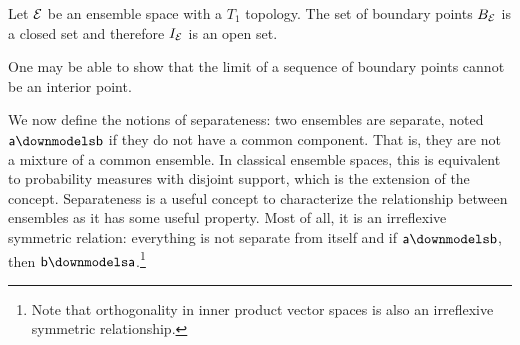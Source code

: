 \begin{conj}
	Let $\mathcal{E}$ be an ensemble space with a $T_1$ topology. The set of boundary points $B_{\mathcal{E}}$ is a closed set and therefore $I_{\mathcal{E}}$ is an open set.
\end{conj}
\begin{remark}
	One may be able to show that the limit of a sequence of boundary points cannot be an interior point.
\end{remark}

We now define the notions of separateness: two ensembles are separate, noted $\ens[a] \separate \ens[b]$ if they do not have a common component. That is, they are not a mixture of a common ensemble. In classical ensemble spaces, this is equivalent to probability measures with disjoint support, which is the extension of the concept. Separateness is a useful concept to characterize the relationship between ensembles as it has some useful property. Most of all, it is an irreflexive symmetric relation: everything is not separate from itself and if $\ens[a] \separate \ens[b]$, then $\ens[b] \separate \ens[a]$.\footnote{Note that orthogonality in inner product vector spaces is also an irreflexive symmetric relationship.}

